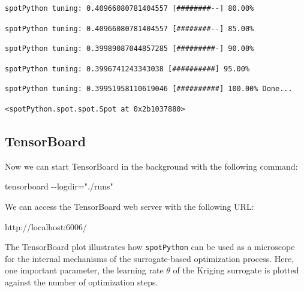 \documentclass[
  letterpaper,
  DIV=11,
  numbers=noendperiod]{scrreprt}
\newenvironment{Shaded}{\begin{snugshade}}{\end{snugshade}}
\newcommand{\NormalTok}[1]{\textcolor[rgb]{0.00,0.23,0.31}{#1}}
\begin{document}
\begin{verbatim}
spotPython tuning: 0.40966080781404557 [########--] 80.00% 
\end{verbatim}

\begin{verbatim}
spotPython tuning: 0.40966080781404557 [########--] 85.00% 
\end{verbatim}

\begin{verbatim}
spotPython tuning: 0.39989087044857285 [#########-] 90.00% 
\end{verbatim}

\begin{verbatim}
spotPython tuning: 0.3996741243343038 [##########] 95.00% 
\end{verbatim}

\begin{verbatim}
spotPython tuning: 0.39951958110619046 [##########] 100.00% Done...
\end{verbatim}

\begin{verbatim}
<spotPython.spot.spot.Spot at 0x2b1037880>
\end{verbatim}

\hypertarget{tensorboard-7}{%
\subsection{TensorBoard}\label{tensorboard-7}}

Now we can start TensorBoard in the background with the following
command:

\begin{Shaded}
\begin{Highlighting}[]
\NormalTok{tensorboard {-}{-}logdir="./runs"}
\end{Highlighting}
\end{Shaded}

We can access the TensorBoard web server with the following URL:

\begin{Shaded}
\begin{Highlighting}[]
\NormalTok{http://localhost:6006/}
\end{Highlighting}
\end{Shaded}

The TensorBoard plot illustrates how \texttt{spotPython} can be used as
a microscope for the internal mechanisms of the surrogate-based
optimization process. Here, one important parameter, the learning rate
\(\theta\) of the Kriging surrogate is plotted against the number of
optimization steps.
\end{document}
